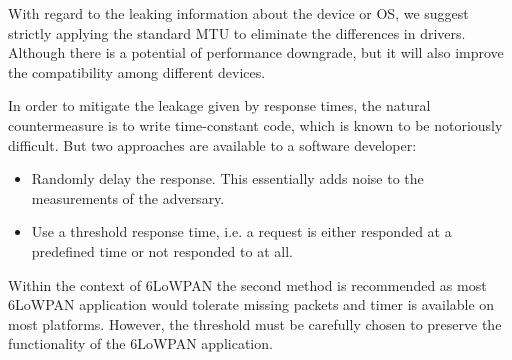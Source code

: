 \documentclass{article}
\begin{document}
With regard to the leaking information about the device or OS, we suggest strictly applying the standard MTU to eliminate the differences in drivers. Although there is a potential of performance downgrade, but it will also improve the compatibility among different devices.


In order to mitigate the leakage given by response times, the natural countermeasure is to write time-constant code, which is known to be notoriously difficult. But two approaches are available to a software developer:
\begin{itemize}
	\item Randomly delay the response. This essentially adds noise to the measurements of the adversary.
	 
	\item Use a threshold response time, i.e. a request is either responded at a predefined time or not responded to at all. 
\end{itemize}
Within the context of 6LoWPAN the second method is recommended as most 6LoWPAN application would tolerate missing packets and timer is available on most platforms. However, the threshold must be carefully chosen to preserve the functionality of the 6LoWPAN application.















%
%
\end{document}
